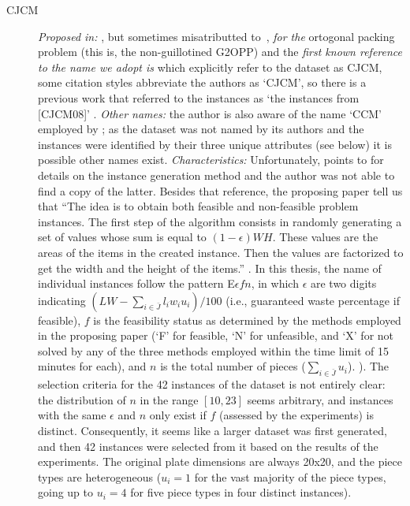\documentclass[ppgc,tese,english,formais,babel]{iiufrgs}
\begin{document}
\begin{description}
\item [CJCM] \emph{Proposed in:} \citet{clautiaux:2007}, but sometimes misatributted to~\citet{clautiaux:2008}, \emph{for the} ortogonal packing problem (this is, the non-guillotined G2OPP) and the \emph{first known reference to the name we adopt is} \citet{cote:2018} which explicitly refer to the dataset as CJCM, some citation styles abbreviate the authors as `CJCM', so there is a previous work that referred to the instances as `the instances from [CJCM08]' \citep{belov2009branch}. \emph{Other names:} the author is also aware of the name `CCM' employed by \citep{fleszar:2016}; as the dataset was not named by its authors and the instances were identified by their three unique attributes (see below) it is possible other names exist. \emph{Characteristics:} Unfortunately, \citet{clautiaux:2007} points to \citet{hopper2002problem} for details on the instance generation method and the author was not able to find a copy of the latter. Besides that reference, the proposing paper tell us that ``The idea is to obtain both feasible and non-feasible problem instances. The first step of the algorithm consists in randomly generating a set of values whose sum is equal to \((1 - \epsilon)WH\). These values are the areas of the items in the created instance. Then the values are factorized to get the width and the height of the items.'' \citep{clautiaux:2007}. In this thesis, the name of individual instances follow the pattern E\(\epsilon f n\), in which \(\epsilon\) are two digits indicating \((LW - \sum_{i \in \bar{J}} l_i w_i u_i)/100\) (i.e., guaranteed waste percentage if feasible), \(f\) is the feasibility status as determined by the methods employed in the proposing paper (`F' for feasible, `N' for unfeasible, and `X' for not solved by any of the three methods employed within the time limit of 15 minutes for each), and \(n\) is the total number of pieces (\(\sum_{i \in \bar{J}} u_i\)). ). The selection criteria for the 42 instances of the dataset is not entirely clear: the distribution of \(n\) in the range \([10, 23]\) seems arbitrary, and instances with the same \(\epsilon\) and \(n\) only exist if \(f\) (assessed by the experiments) is distinct. Consequently, it seems like a larger dataset was first generated, and then 42 instances were selected from it based on the results of the experiments. The original plate dimensions are always 20x20, and the piece types are heterogeneous (\(u_i = 1\) for the vast majority of the piece types, going up to \(u_i = 4\) for five piece types in four distinct instances).

\end{description}
\end{document}
